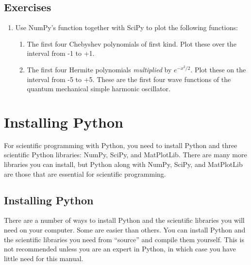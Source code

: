 \documentclass[letterpaper,10pt,english]{sphinxmanual}
\begin{document}
\section{Exercises}
\label{chap9/chap9_scipy:exercises}\begin{enumerate}
\item {} 
Use NumPy's  function together with SciPy to plot the following functions:
\begin{enumerate}
\item {} 
The first four Chebyshev polynomials of first kind.  Plot these over the interval from -1 to +1.

\item {} 
The first four Hermite polynomials  \emph{multiplied} by $e^{-x^2/2}$.  Plot these on the interval from -5 to +5.  These are the first four wave functions of the quantum mechanical simple harmonic oscillator.

\end{enumerate}

\end{enumerate}

\appendix
{}\label{apdx1/apdx1_install::doc}

\chapter{Installing Python}
\label{apdx1/apdx1_install:apdx1}\label{apdx1/apdx1_install:installing-python}
For scientific programming with Python, you need to install Python and three scientific Python libraries: NumPy, SciPy, and MatPlotLib.  There are many more libraries you can install, but Python along with NumPy, SciPy, and MatPlotLib are those that are essential for scientific programming.


\section{Installing Python}
\label{apdx1/apdx1_install:id1}
There are a number of ways to install Python and the scientific libraries you will need on your computer.  Some are easier than others.  You can install Python and the scientific libraries you need from ``source'' and compile them yourself.  This is not recommended unless you are an expert in Python, in which case you have little need for this manual.
\end{document}
